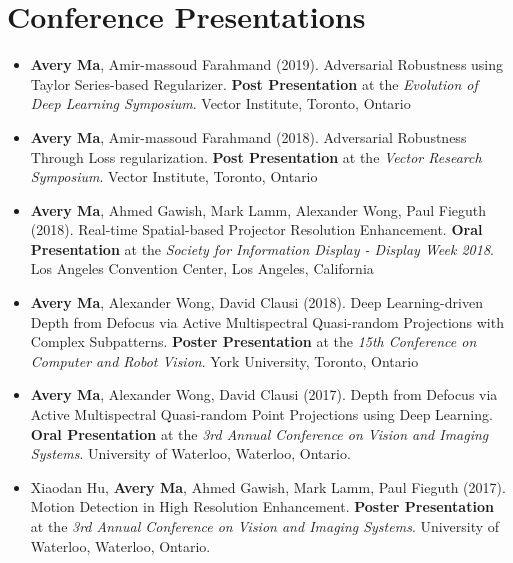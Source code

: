 \section*{Conference Presentations}
\vspace{\postsubhead}
\begin{adjustwidth}{\indentleft}{\indentright}
 \begin{itemize}
    \setlength\itemsep{0.5em}
    
    \item \textbf{Avery Ma}, Amir-massoud Farahmand (2019). Adversarial Robustness using Taylor Series-based Regularizer. \textbf{Post Presentation} at the \emph{Evolution of Deep Learning Symposium}. Vector Institute, Toronto, Ontario
    
    \item \textbf{Avery Ma}, Amir-massoud Farahmand (2018). Adversarial Robustness Through Loss regularization. \textbf{Post Presentation} at the \emph{Vector Research Symposium}. Vector Institute, Toronto, Ontario
    
    \item \textbf{Avery Ma}, Ahmed Gawish, Mark Lamm, Alexander Wong, Paul Fieguth (2018). Real-time Spatial-based Projector Resolution Enhancement. \textbf{Oral Presentation} at the \emph{Society for Information Display - Display Week 2018}. Los Angeles Convention Center, Los Angeles, California
    
    \item \textbf{Avery Ma}, Alexander Wong, David Clausi (2018). Deep Learning-driven Depth from Defocus via Active Multispectral Quasi-random Projections with Complex Subpatterns. \textbf{Poster Presentation} at the \emph{15th Conference on Computer and Robot Vision}. York University, Toronto, Ontario
            
    \item \textbf{Avery Ma}, Alexander Wong, David Clausi (2017). Depth from Defocus via Active Multispectral Quasi-random Point Projections using Deep Learning. \textbf{Oral Presentation} at the \emph{3rd Annual Conference on Vision and Imaging Systems}. University of Waterloo, Waterloo, Ontario.
    
    \item Xiaodan Hu, \textbf{Avery Ma}, Ahmed Gawish, Mark Lamm, Paul Fieguth (2017). Motion Detection in High Resolution Enhancement. \textbf{Poster Presentation} at the \emph{3rd Annual Conference on Vision and Imaging Systems}. University of Waterloo, Waterloo, Ontario.
    

\end{itemize}
\end{adjustwidth}
